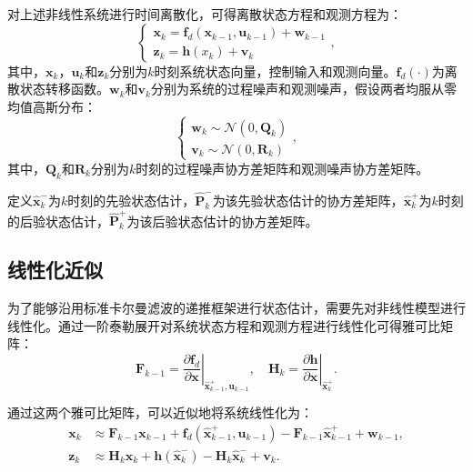 对上述非线性系统进行时间离散化，可得离散状态方程和观测方程为：
\begin{equation}
    \begin{cases}
        \boldsymbol{x}_k = \boldsymbol{f}_d(\boldsymbol{x}_{k-1}, \boldsymbol{u}_{k-1}) + \boldsymbol{w}_{k-1}\\
        \boldsymbol{z}_k = \boldsymbol{h}(x_{k}) + \boldsymbol{v}_k
    \end{cases},
\end{equation}
其中，$\boldsymbol{x}_k$，$\boldsymbol{u}_k$和$\boldsymbol{z}_k$分别为$k$时刻系统状态向量，控制输入和观测向量。$\boldsymbol{f}_d(\cdot)$为离散状态转移函数。$\boldsymbol{w}_k$和$\boldsymbol{v}_k$分别为系统的过程噪声和观测噪声，假设两者均服从零均值高斯分布：
\begin{equation}
    \begin{cases}
        \boldsymbol{w}_k \sim \mathcal{N}(0, \boldsymbol{Q}_k)\\
        \boldsymbol{v}_k \sim \mathcal{N}(0, \boldsymbol{R}_k)
    \end{cases},
\end{equation}
其中，$\boldsymbol{Q}_k$和$\boldsymbol{R}_k$分别为$k$时刻的过程噪声协方差矩阵和观测噪声协方差矩阵。

定义$\hat{\boldsymbol{x}}_{k}^-$为$k$时刻的先验状态估计，$\hat{\boldsymbol{P}}_{k}^-$为该先验状态估计的协方差矩阵，$\hat{\boldsymbol{x}}_{k}^+$为$k$时刻的后验状态估计，$\hat{\boldsymbol{P}}_{k}^+$为该后验状态估计的协方差矩阵。

\subsection{线性化近似}
为了能够沿用标准卡尔曼滤波的递推框架进行状态估计，需要先对非线性模型进行线性化。通过一阶泰勒展开对系统状态方程和观测方程进行线性化可得雅可比矩阵：
\begin{equation}
    \boldsymbol{F}_{k-1} = \left. \frac{\partial \boldsymbol{f}_d}{\partial \boldsymbol{x}} \right|_{\hat{\boldsymbol{x}}_{k-1}^+, \boldsymbol{u}_{k-1}}, \quad \boldsymbol{H}_{k} = \left. \frac{\partial \boldsymbol{h}}{\partial \boldsymbol{x}} \right|_{\hat{\boldsymbol{x}}_{k}^+}.
\end{equation}

通过这两个雅可比矩阵，可以近似地将系统线性化为：
\begin{equation}
    \begin{aligned}
    \boldsymbol{x}_{k} &\approx \boldsymbol{F}_{k-1} \boldsymbol{x}_{k-1} + \boldsymbol{f}_d(\hat{\boldsymbol{x}}_{k-1}^{+}, \boldsymbol{u}_{k-1}) - \boldsymbol{F}_{k-1} \hat{\boldsymbol{x}}_{k-1}^{+} + \boldsymbol{w}_{k-1}, \\
    \boldsymbol{z}_{k} &\approx \boldsymbol{H}_{k} \boldsymbol{x}_{k} + \boldsymbol{h}(\hat{\boldsymbol{x}}_{k}^{-}) - \boldsymbol{H}_{k} \hat{\boldsymbol{x}}_{k}^{-} + \boldsymbol{v}_{k}.
    \end{aligned}
\end{equation}

